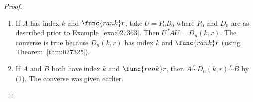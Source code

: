 \begin{proof}
\begin{enumerate}
\item If $A$ has index $k$ and $\func{rank }r$, take $U = P_{0}D_{0}$ where $P_{0}$ and $D_{0}$ are as described prior to Example~\ref{exa:027363}. Then $U^{T}AU = D_{n}(k, r)$. The converse is true because $D_{n}(k, r)$ has index $k$ and $\func{rank }r$ (using Theorem~\ref{thm:027325}).

\item If $A$ and $B$ both have index $k$ and $\func{rank }r$, then $A \stackrel{c}{\sim} D_{n}(k, r) \stackrel{c}{\sim} B$ by (1). The converse was given earlier.

\end{enumerate}
\end{proof}

